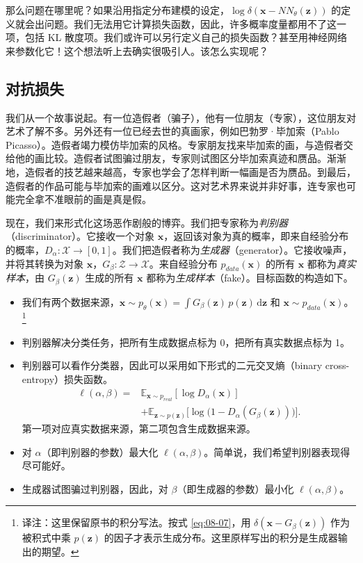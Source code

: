 那么问题在哪里呢？如果沿用指定分布建模的设定，$\log\delta(\mathbf x-NN_\theta(\mathbf z))$ 的定义就会出问题。我们无法用它计算损失函数，因此，许多概率度量都用不了这一项，包括 KL 散度项。我们或许可以另行定义自己的损失函数？甚至用神经网络来参数化它！这个想法听上去确实很吸引人。该怎么实现呢？

\subsection{对抗损失}

我们从一个故事说起。有一位造假者（骗子），他有一位朋友（专家），这位朋友对艺术了解不多。另外还有一位已经去世的真画家，例如巴勃罗·毕加索（Pablo Picasso）。造假者竭力模仿毕加索的风格。专家朋友找来毕加索的画，与造假者交给他的画比较。造假者试图骗过朋友，专家则试图区分毕加索真迹和赝品。渐渐地，造假者的技艺越来越高，专家也学会了怎样判断一幅画是否为赝品。到最后，造假者的作品可能与毕加索的画难以区分。这对艺术界来说并非好事，连专家也可能完全拿不准眼前的画是真是假。

现在，我们来形式化这场恶作剧般的博弈。我们把专家称为\emph{判别器}（discriminator）。它接收一个对象 $\mathbf x$，返回该对象为真的概率，即来自经验分布的概率，$D_\alpha\colon\mathcal X\to[0,1]$。我们把造假者称为\emph{生成器}（generator）。它接收噪声，并将其转换为对象 $\mathbf x$，$G_\beta\colon\mathcal Z\to\mathcal X$。来自经验分布 $p_{\mathit{data}}(\mathbf x)$ 的所有 $\mathbf x$ 都称为\emph{真实样本}，由 $G_\beta(\mathbf z)$ 生成的所有 $\mathbf x$ 都称为\emph{生成样本}（fake）。目标函数的构造如下。
\begin{itemize}
  \item 我们有两个数据来源，$\mathbf x\sim p_\theta(\mathbf x)=\int G_\beta(\mathbf z)\,p(\mathbf z)\,\mathrm d\mathbf z$ 和 $\mathbf x\sim p_{\mathit{data}}(\mathbf x)$。\footnote{译注：这里保留原书的积分写法。按式 \eqref{eq:08-07}，用 $\delta(\mathbf x-G_\beta(\mathbf z))$ 作为被积式中乘 $p(\mathbf z)$ 的因子才表示生成分布。这里原样写出的积分是生成器输出的期望。}
  \item 判别器解决分类任务，把所有生成数据点标为 0，把所有真实数据点标为 1。
  \item 判别器可以看作分类器，因此可以采用如下形式的二元交叉熵（binary cross-entropy）损失函数。
  \begin{equation}
    \begin{aligned}
      \ell(\alpha,\beta)={}&
      \mathbb E_{\mathbf x\sim p_{\mathit{real}}}[\log D_\alpha(\mathbf x)]\\
      &+\mathbb E_{\mathbf z\sim p(\mathbf z)}
        \bigl[\log\bigl(1-D_\alpha(G_\beta(\mathbf z))\bigr)\bigr].
    \end{aligned}
    \tag{8.8}\label{eq:08-08}
  \end{equation}
  第一项对应真实数据来源，第二项包含生成数据来源。
  \item 对 $\alpha$（即判别器的参数）最大化 $\ell(\alpha,\beta)$。简单说，我们希望判别器表现得尽可能好。
  \item 生成器试图骗过判别器，因此，对 $\beta$（即生成器的参数）最小化 $\ell(\alpha,\beta)$。
\end{itemize}

